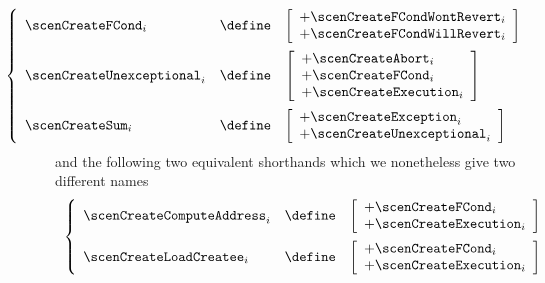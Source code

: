 \[
	\hspace*{-2cm}
	\left\{ \begin{array}{lcl}
		\scenCreateFCond_{i} & \define &
		\left[ \begin{array}{l}
			+ \scenCreateFCondWontRevert                     _{i}   \\
			+ \scenCreateFCondWillRevert                     _{i}   \\
		\end{array} \right]
		\vspace{2mm} \\
		\scenCreateUnexceptional_{i} & \define &
		\left[ \begin{array}{l}
			+ \scenCreateAbort           _{i}  \\
			+ \scenCreateFCond           _{i}  \\
			+ \scenCreateExecution       _{i}  \\
		\end{array} \right]
		\vspace{2mm} \\
		\scenCreateSum_{i} & \define &
		\left[ \begin{array}{l}
			+ \scenCreateException       _{i}  \\
			+ \scenCreateUnexceptional   _{i}  \\
		\end{array} \right]
	\end{array} \right.
\]
and the following two equivalent shorthands which we nonetheless give two different names
\[
	\left\{ \begin{array}{lcl}
		\scenCreateComputeAddress _{i} & \define &
		\left[ \begin{array}{l}
			+ \scenCreateFCond     _{i} \\
			+ \scenCreateExecution _{i} \\
		\end{array} \right] \vspace{2mm} \\
		\scenCreateLoadCreatee _{i} & \define &
		\left[ \begin{array}{l}
			+ \scenCreateFCond     _{i} \\
			+ \scenCreateExecution _{i} \\
		\end{array} \right] \\
	\end{array} \right.
\]
